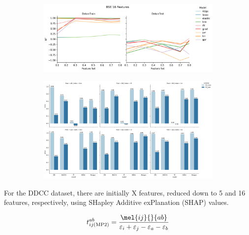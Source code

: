 \documentclass[journal=jacsat,manuscript=article]{achemso}
\begin{document}
\begin{figure}[H]
	\centering	
	\begin{subfigure}[b]{0.49\textwidth}
		\centering
		\includegraphics[width=\linewidth]{../classical_testing/BSE/BSE_16_learning_curve}
		\caption{}
		\label{fig:bse16learningcurve}
	\end{subfigure}
	\hfill
	\begin{subfigure}[b]{0.49\textwidth}
		\centering
		\includegraphics[width=\linewidth]{../classical_testing/BSE/classical_funcfit}
		\caption{}
		\label{fig:classicalfuncfit}
	\end{subfigure}
	\caption{}
	\label{fig:bse16classical}	
\end{figure}






For the DDCC dataset, there are initially X features, reduced down to 5 and 16 features, respectively, using SHapley Additive exPlanation (SHAP) values.\cite{lundberg_unified_2017} 


\begin{equation}
	t^{ab}_{ij(\text{MP2})} = \frac{\mel{ij}{}{ab}}{\varepsilon_{i}+\varepsilon_{j}-\varepsilon_{a}-\varepsilon_{b}}
	\label{eq:MP2_t2}
\end{equation}
\end{document}
